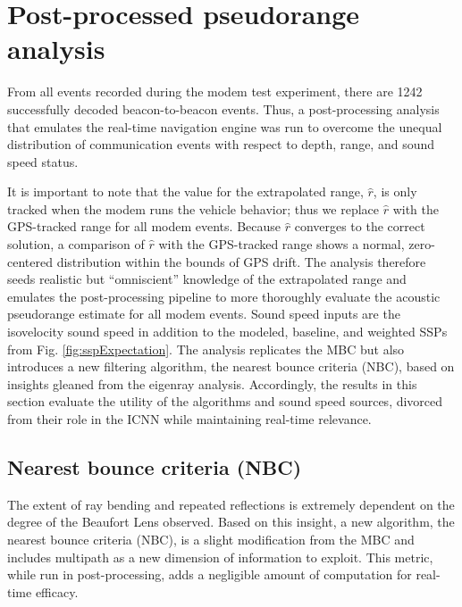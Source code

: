 \clearpage
\section{\label{sec:post} Post-processed pseudorange analysis}

From all events recorded during the modem test experiment, there are 1242 successfully decoded beacon-to-beacon events.
Thus, a post-processing analysis that emulates the real-time navigation engine was run to overcome the unequal distribution of communication events with respect to depth, range, and sound speed status.

It is important to note that the value for the extrapolated range, $\hat{r}$, is only tracked when the modem runs the vehicle behavior; thus we replace $\hat{r}$ with the GPS-tracked range for all modem events.
Because $\hat{r}$ converges to the correct solution, a comparison of $\hat{r}$ with the GPS-tracked range shows a normal, zero-centered distribution within the bounds of GPS drift.
The analysis therefore seeds realistic but ``omniscient'' knowledge of the extrapolated range and emulates the post-processing pipeline to more thoroughly evaluate the acoustic pseudorange estimate for all modem events.
Sound speed inputs are the isovelocity sound speed in addition to the modeled, baseline, and weighted SSPs from Fig. \ref{fig:sspExpectation}.
The analysis replicates the MBC but also introduces a new filtering algorithm, the nearest bounce criteria (NBC), based on insights gleaned from the eigenray analysis.
Accordingly, the results in this section evaluate the utility of the algorithms and sound speed sources, divorced from their role in the ICNN while maintaining real-time relevance.

\subsection{Nearest bounce criteria (NBC)}

 The extent of ray bending and repeated reflections is extremely dependent on the degree of the Beaufort Lens observed.
Based on this insight, a new algorithm, the nearest bounce criteria (NBC), is a slight modification from the MBC and includes multipath as a new dimension of information to exploit.
This metric, while run in post-processing, adds a negligible amount of computation for real-time efficacy.

